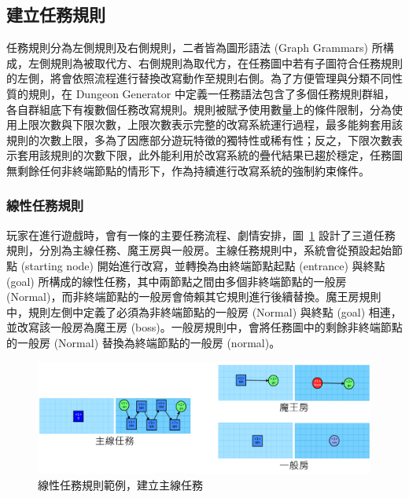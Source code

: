 

\subsection{建立任務規則}
\label{ssec:method-missiongrammars-rules}

任務規則分為左側規則及右側規則，二者皆為圖形語法 (Graph Grammars) 所構成，左側規則為被取代方、右側規則為取代方，在任務圖中若有子圖符合任務規則的左側，將會依照流程進行替換改寫動作至規則右側。為了方便管理與分類不同性質的規則，在 Dungeon Generator 中定義一任務語法包含了多個任務規則群組，各自群組底下有複數個任務改寫規則。規則被賦予使用數量上的條件限制，分為使用上限次數與下限次數，上限次數表示完整的改寫系統運行過程，最多能夠套用該規則的次數上限，多為了因應部分遊玩特徵的獨特性或稀有性；反之，下限次數表示套用該規則的次數下限，此外能利用於改寫系統的疊代結果已趨於穩定，任務圖無剩餘任何非終端節點的情形下，作為持續進行改寫系統的強制約束條件。

\subsubsection{線性任務規則}
\label{sssec:method-missiongrammars-rules-linearrules}

玩家在進行遊戲時，會有一條的主要任務流程、劇情安排，圖~\ref{fig:missiongrammars-rules-linear-example} 設計了三道任務規則，分別為主線任務、魔王房與一般房。主線任務規則中，系統會從預設起始節點 (starting node) 開始進行改寫，並轉換為由終端節點起點 (entrance) 與終點 (goal) 所構成的線性任務，其中兩節點之間由多個非終端節點的一般房 (Normal)，而非終端節點的一般房會倚賴其它規則進行後續替換。魔王房規則中，規則左側中定義了必須為非終端節點的一般房 (Normal) 與終點 (goal) 相連，並改寫該一般房為魔王房 (boss)。一般房規則中，會將任務圖中的剩餘非終端節點的一般房 (Normal) 替換為終端節點的一般房 (normal)。

\begin{figure}[ht]
  \begin{center}
    \includegraphics[width=1.0\textwidth]{figures/missiongrammars-rules-linear-example.png}
    \caption{線性任務規則範例，建立主線任務}
    \label{fig:missiongrammars-rules-linear-example}
  \end{center}
\end{figure}

